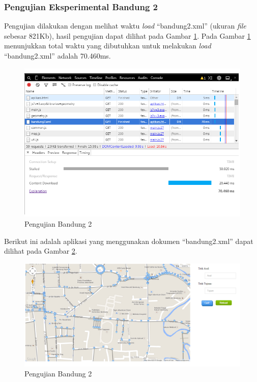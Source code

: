\subsubsection{Pengujian Eksperimental Bandung 2}
Pengujian dilakukan dengan melihat waktu \textit{load} ``bandung2.xml'' (ukuran
\textit{file} sebesar 821Kb), hasil pengujian dapat dilihat pada Gambar
\ref{fig:pu_bandung2}. Pada Gambar \ref{fig:pu_bandung2} menunjukkan total waktu yang dibutuhkan untuk 
melakukan \textit{load} ``bandung2.xml'' adalah 70.460ms. 
\begin{figure}[h]
\centering
\includegraphics[scale=0.8]{Gambar/pu_bandung2}
\caption[Pengujian Bandung 2]{Pengujian Bandung 2}
\label{fig:pu_bandung2}
\end{figure}
Berikut ini adalah aplikasi yang menggunakan dokumen ``bandung2.xml'' dapat
dilihat pada Gambar \ref{fig:bandung2_load}.
\begin{figure}[h]
\centering
\includegraphics[scale=0.45]{Gambar/bandung2_load}
\caption[Pengujian Bandung 2]{Pengujian Bandung 2}
\label{fig:bandung2_load}
\end{figure}
